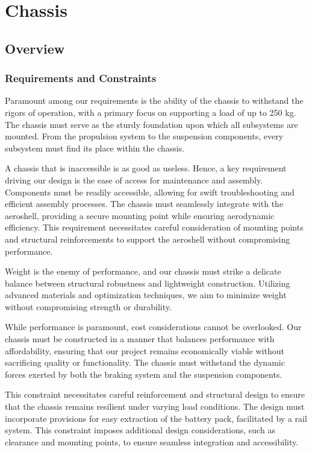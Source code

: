 
\section{Chassis}
\label{sec:chassis}



\subsection{Overview}


\subsubsection{Requirements and Constraints}

Paramount among our requirements is the ability of the chassis to withstand the rigors of operation, with a primary focus on supporting a load of up to 250 kg. The chassis must serve as the sturdy foundation upon which all subsystems are mounted. From the propulsion system to the suspension components, every subsystem must find its place within the chassis. 

A chassis that is inaccessible is as good as useless. Hence, a key requirement driving our design is the ease of access for maintenance and assembly. Components must be readily accessible, allowing for swift troubleshooting and efficient assembly processes. The chassis must seamlessly integrate with the aeroshell, providing a secure mounting point while ensuring aerodynamic efficiency. This requirement necessitates careful consideration of mounting points and structural reinforcements to support the aeroshell without compromising performance. 

Weight is the enemy of performance, and our chassis must strike a delicate balance between structural robustness and lightweight construction. Utilizing advanced materials and optimization techniques, we aim to minimize weight without compromising strength or durability. 

While performance is paramount, cost considerations cannot be overlooked. Our chassis must be constructed in a manner that balances performance with affordability, ensuring that our project remains economically viable without sacrificing quality or functionality. The chassis must withstand the dynamic forces exerted by both the braking system and the suspension components. 

This constraint necessitates careful reinforcement and structural design to ensure that the chassis remains resilient under varying load conditions. The design must incorporate provisions for easy extraction of the battery pack, facilitated by a rail system. This constraint imposes additional design considerations, such as clearance and mounting points, to ensure seamless integration and accessibility.


